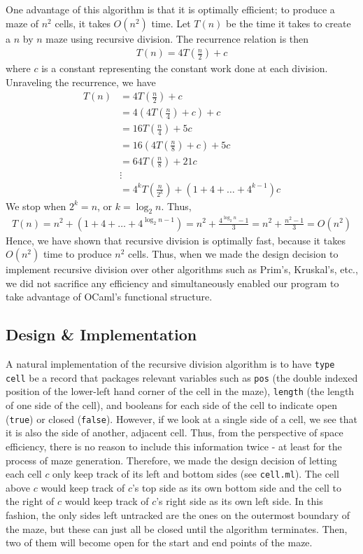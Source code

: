 \documentclass[11pt, margin=1in]{article}
\newcommand{\tab}{\par \qquad}
\begin{document}
\tab One advantage of this algorithm is that it is optimally efficient; to produce a maze of $n^2$ cells, it takes $O(n^2)$ time.  Let $T(n)$ be the time it takes to create a $n$ by $n$ maze using recursive division.  The recurrence relation is then
\begin{align*}
T(n) = 4T\left(\frac{n}{2}\right) + c
\end{align*}  
where $c$ is a constant representing the constant work done at each division.  Unraveling the recurrence, we have
\begin{align*}
T(n) &= 4T\left(\frac{n}{2}\right) + c \\
&= 4\left(4T\left(\frac{n}{4}\right) + c\right) + c \\ 
&= 16 T\left(\frac{n}{4}\right) + 5c \\
&= 16 \left(4T\left(\frac{n}{8}\right) + c\right) + 5c \\ 
&= 64 T\left(\frac{n}{8}\right) + 21c \\
& \vdots \\
& = 4^k T\left(\frac{n}{2^k}\right) + (1 + 4 + \ldots + 4^{k-1})c
\end{align*}
We stop when $2^k = n$, or $k = \log_2n$.  Thus, 
\begin{align*}
T(n) = n^2 + (1 + 4 + \ldots + 4^{\log_2n-1}) = n^2 + \frac{4^{\log_2n} - 1}{3} = n^2 + \frac{n^2 - 1}{3} = O(n^2)
\end{align*}
Hence, we have shown that recursive division is optimally fast, because it takes $O(n^2)$ time to produce $n^2$ cells.  Thus, when we made the design decision to implement recursive division over other algorithms such as Prim's, Kruskal's, etc., we did not sacrifice any efficiency and simultaneously enabled our program to take advantage of OCaml's functional structure.

\subsection{Design \& Implementation}
 
A natural implementation of the recursive division algorithm is to have \texttt{type cell} be a record that packages relevant variables such as \texttt{pos} (the double indexed position of the lower-left hand corner of the cell in the maze), \texttt{length} (the length of one side of the cell), and booleans for each side of the cell to indicate open (\texttt{true}) or closed (\texttt{false}).  However, if we look at a single side of a cell, we see that it is also the side of another, adjacent cell.  Thus, from the perspective of space efficiency, there is no reason to include this information twice - at least for the process of maze generation.  Therefore, we made the design decision of letting each cell $c$ only keep track of its left and bottom sides (see \texttt{cell.ml}).  The cell above $c$ would keep track of $c$'s top side as its own bottom side and the cell to the right of $c$ would keep track of $c$'s right side as its own left side.  In this fashion, the only sides left untracked are the ones on the outermost boundary of the maze, but these can just all be closed until the algorithm terminates.  Then, two of them will become open for the start and end points of the maze. 
\end{document}
